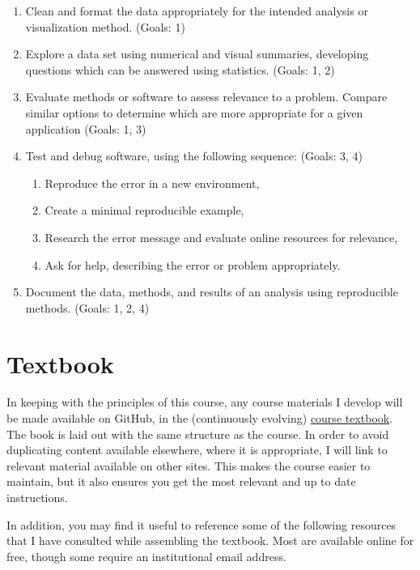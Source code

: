 \documentclass[
  11pt,
  letterpaper,
  DIV=11,
  numbers=noendperiod]{scrartcl}
\providecommand{\tightlist}{%
  \setlength{\itemsep}{0pt}\setlength{\parskip}{0pt}}\usepackage{longtable,booktabs,array}
\begin{document}
\begin{enumerate}
\def\labelenumi{\Alph{enumi}.}
\item
  Clean and format the data appropriately for the intended analysis or
  visualization method. (Goals: 1)
\item
  Explore a data set using numerical and visual summaries, developing
  questions which can be answered using statistics. (Goals: 1, 2)
\item
  Evaluate methods or software to assess relevance to a problem. Compare
  similar options to determine which are more appropriate for a given
  application (Goals: 1, 3)
\item
  Test and debug software, using the following sequence: (Goals: 3, 4)

  \begin{enumerate}
  \def\labelenumii{\arabic{enumii}.}
  \tightlist
  \item
    Reproduce the error in a new environment,
  \item
    Create a minimal reproducible example,
  \item
    Research the error message and evaluate online resources for
    relevance,
  \item
    Ask for help, describing the error or problem appropriately.
  \end{enumerate}
\item
  Document the data, methods, and results of an analysis using
  reproducible methods. (Goals: 1, 2, 4)
\end{enumerate}

\hypertarget{textbook}{%
\section{Textbook}\label{textbook}}

In keeping with the principles of this course, any course materials I
develop will be made available on GitHub, in the (continuously evolving)
\href{https://srvanderplas.github.io/unl-stat850/}{course textbook}. The
book is laid out with the same structure as the course. In order to
avoid duplicating content available elsewhere, where it is appropriate,
I will link to relevant material available on other sites. This makes
the course easier to maintain, but it also ensures you get the most
relevant and up to date instructions.

In addition, you may find it useful to reference some of the following
resources that I have consulted while assembling the textbook. Most are
available online for free, though some require an institutional email
address.
\end{document}
